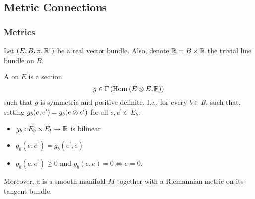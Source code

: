 \documentclass[main.tex]{subfiles}
\begin{document}
\subsection{Metric Connections}

\subsubsection{Metrics}

Let $(E, B , \pi, \mathbb{R}^r)$ be a real vector bundle. Also, denote $\underline{\mathbb{R}} = B \times \mathbb{R}$ the trivial line bundle on $B$.

\begin{defn}
  A  on $E$ is a section
  \[
  g \in \Gamma\left( \text{Hom}_{}\left( E \otimes E, \underline{\mathbb{R}} \right) \right)
  \]
  such that $g$ is symmetric and positive-definite. I.e., for every $b \in B$,
  such that, setting $g_b(e, e^\prime) = g_b(e\otimes e^\prime)$ for all $e, e^\prime \in E_b$:
  \begin{itemize}
    \item $g_b : E_b \times E_b \to \mathbb{R}$ is bilinear
    \item $g_b(e, e^\prime) = g_b(e^\prime, e)$
    \item $g_b(e, e^\prime) \geq 0$ and $g_b(e, e) = 0 \iff e = 0$.
  \end{itemize}
  Moreover, a  is a smooth manifold $M$ together with a Riemannian metric on its tangent bundle.
\end{defn}
\end{document}
